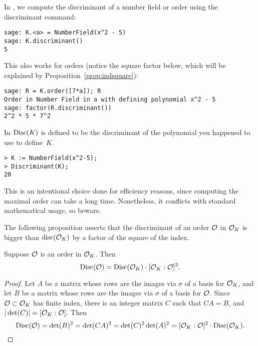 \begin{example}
In \sage, we compute the discriminant of a number field or order
using the discriminant command:
\begin{verbatim}
sage: K.<a> = NumberField(x^2 - 5)
sage: K.discriminant()
5
\end{verbatim}%

\noindent{}This also works for orders (notice the square factor 
below, which will be explained
by Proposition~\ref{prop:indsquare}):
\begin{verbatim}
sage: R = K.order([7*a]); R
Order in Number Field in a with defining polynomial x^2 - 5
sage: factor(R.discriminant())
2^2 * 5 * 7^2
\end{verbatim}

 In \magma{} $\operatorname{Disc}(K)$ is defined to be the
discriminant of the polynomial you happened to use to define~$K$.
\begin{verbatim}
> K := NumberField(x^2-5);
> Discriminant(K);
20
\end{verbatim}
This is an intentional choice done for efficiency reasons, since
computing the maximal order can take a long time.  Nonetheless, it
conflicts with standard mathematical usage, so beware. 
\end{example}


The following proposition asserts that the discriminant of an order
$\mathcal{O}$ in $\mathcal{O}_K$ is bigger than $\operatorname{disc}(\mathcal{O}_K)$ by a factor of the square
of the index.
\begin{proposition}\label{prop:indsquare}
Suppose $\mathcal{O}$ is an order in $\mathcal{O}_K$. Then
$$
  \operatorname{Disc}(\mathcal{O}) =  \operatorname{Disc}(\mathcal{O}_K)\cdot [\mathcal{O}_K:\mathcal{O}]^2.
$$
\end{proposition}
\begin{proof}
Let $A$ be a matrix whose rows are the images via $\sigma$ of a basis
for $\mathcal{O}_K$, and let $B$ be a matrix whose rows are the images via
$\sigma$ of a basis for $\mathcal{O}$.  Since $\mathcal{O}\subset \mathcal{O}_K$ has finite
index, there is an integer matrix $C$ such that $CA=B$,
and $|\det(C)|= [\mathcal{O}_K:\mathcal{O}]$.  Then
\[\operatorname{Disc}(\mathcal{O}) = \det(B)^2 = \det(CA)^2 = \det(C)^2\det(A)^2
  = [\mathcal{O}_K:\mathcal{O}]^2 \cdot \operatorname{Disc}(\mathcal{O}_K).
\]
\end{proof}

